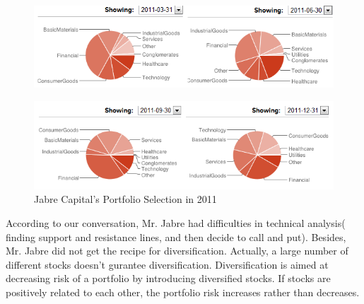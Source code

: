 \documentclass[12pt,letterpaper]{article}
\theoremstyle{definition}
\begin{document}
\begin{figure}[h]
    \begin{center}
        \includegraphics[width=\textwidth]{../images/1.png}
    \end{center}
    \label{fig:piechart}
\end{figure}  
\begin{figure}[h]
    \begin{center}
        \includegraphics[width=\textwidth]{../images/2.png}
    \end{center}
    \caption{Jabre Capital's Portfolio Selection in 2011}
    \label{fig:piechart}
\end{figure}  
\newpage
According to our conversation, Mr. Jabre had difficulties in technical analysis( finding support and resistance lines, and then decide to call and put). Besides, Mr. Jabre did not get the recipe for diversification. Actually, a large number of different stocks doesn't gurantee diversification. Diversification is aimed at decreasing risk of a portfolio by introducing diversified stocks. If stocks are positively related to each other, the portfolio risk increases rather than decreases.
\end{document}
